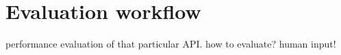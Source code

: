 


\section{Evaluation workflow\label{sec:sentiment-evaluation-workflow}}


performance evaluation of that particular API.
how to evaluate? human input! 




